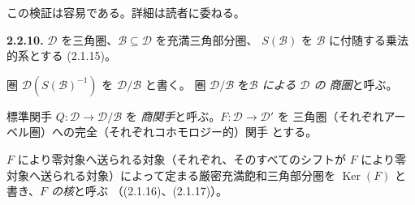 この検証は容易である。詳細は読者に委ねる。

\smallskip
\noindent\textbf{2.2.10.}\quad
$\mathcal D$ を三角圏、$\mathcal B\subseteq\mathcal D$ を充満三角部分圏、
$S(\mathcal B)$ を $\mathcal B$ に付随する乗法的系とする (2.1.15)。

圏 $\mathcal D(S(\mathcal B)^{-1})$ を $\mathcal D/\mathcal B$ と書く。
圏 $\mathcal D/\mathcal B$ を\emph{$\mathcal B$ による $\mathcal D$ の
商圏}と呼ぶ。

標準関手 $Q\colon\mathcal D\longrightarrow\mathcal D/\mathcal B$ を
\emph{商関手}と呼ぶ。$F\colon\mathcal D\longrightarrow\mathcal D'$ を
三角圏（それぞれアーベル圏）への完全（それぞれコホモロジー的）関手
とする。

$F$ により零対象へ送られる対象（それぞれ、そのすべてのシフトが
$F$ により零対象へ送られる対象）によって定まる厳密充満飽和三角部分圏を
$\operatorname{Ker}(F)$ と書き、\emph{$F$ の核}と呼ぶ
（(2.1.16)、(2.1.17)）。

\endgroup
